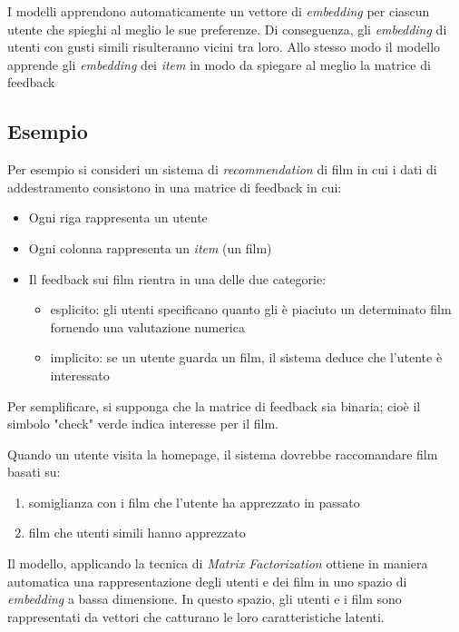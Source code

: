 I modelli apprendono automaticamente un vettore di \textit{embedding} per ciascun utente che spieghi al meglio le sue preferenze. Di conseguenza, gli \textit{embedding} di utenti con gusti simili risulteranno vicini tra loro. Allo stesso modo il modello apprende gli \textit{embedding} dei 
\textit{item} in modo da spiegare al meglio la matrice di feedback

\subsection{Esempio}

Per esempio si consideri un sistema di \textit{recommendation} di film in cui i dati di addestramento consistono in una matrice di feedback in cui:

\begin{itemize}
    \item Ogni riga rappresenta un utente
    \item Ogni colonna rappresenta un \textit{item} (un film)
    \item Il feedback sui film rientra in una delle due categorie:
    \begin{itemize}
        \item esplicito: gli utenti specificano quanto gli è piaciuto un determinato film fornendo una valutazione numerica
        \item implicito: se un utente guarda un film, il sistema deduce che l'utente è interessato
    \end{itemize}
\end{itemize}

Per semplificare, si supponga che la matrice di feedback sia binaria; cioè il simbolo "check" verde indica interesse per il film.

Quando un utente visita la homepage, il sistema dovrebbe raccomandare film basati su:

\begin{enumerate}
    \item somiglianza con i film che l'utente ha apprezzato in passato
    \item film che utenti simili hanno apprezzato
\end{enumerate}

Il modello, applicando la tecnica di \textit{Matrix Factorization} ottiene in maniera automatica una rappresentazione degli utenti e dei film in uno spazio di \textit{embedding} a bassa dimensione. In questo spazio, gli utenti e i film sono rappresentati da vettori che catturano le loro caratteristiche latenti.

